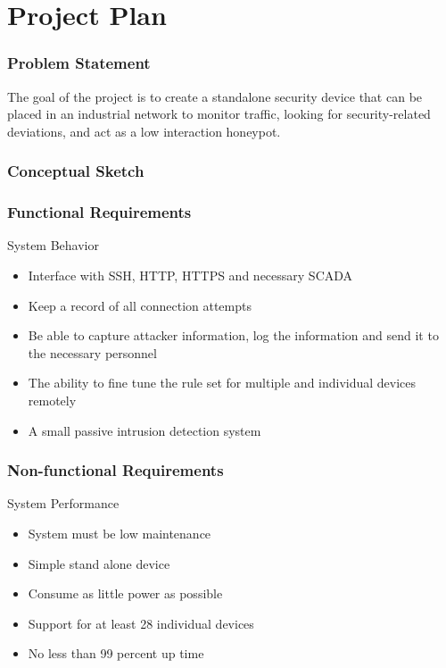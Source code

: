 \section{Project Plan}

\begin{frame}
\frametitle{Problem Statement}

The goal of the project is to create a standalone security device that can be placed in an industrial network to monitor traffic, looking for security-related deviations, and act as a low interaction honeypot.

\end{frame}

\begin{frame}
\frametitle{Conceptual Sketch}


\end{frame}

\begin{frame}
\frametitle{Functional Requirements}
System Behavior
\begin{itemize}
\item Interface with SSH, HTTP, HTTPS and necessary SCADA 
\item Keep a record of all connection attempts
\item Be able to capture attacker information, log the information  and send it to the necessary personnel 
\item The ability to fine tune the rule set for multiple and individual devices remotely 
\item A small passive intrusion detection system 
\end{itemize}

\end{frame}

\begin{frame}
\frametitle{Non-functional Requirements}
System Performance
\begin{itemize}
\item System must be low maintenance
\item Simple stand alone device
\item Consume as little power as possible
\item Support for at least 28 individual devices
\item No less than 99 percent up time
\end{itemize}

\end{frame}

